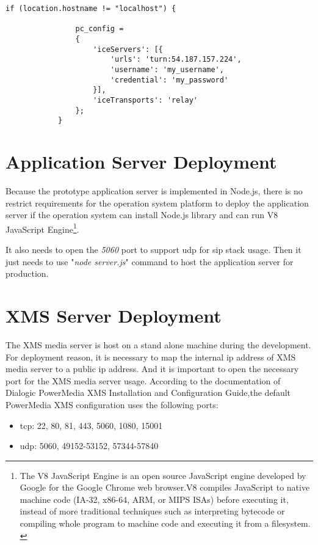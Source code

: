 \begin{lstlisting}[caption={Using TURN Server on WebRTC Client},label={code:client_turn_server}]
if (location.hostname != "localhost") {
  			
				pc_config = 
				{
					'iceServers': [{
						'urls': 'turn:54.187.157.224',
						'username': 'my_username',
						'credential': 'my_password'
					}],
					'iceTransports': 'relay'
				};
			}
\end{lstlisting}


\section{Application Server Deployment}

\par Because the prototype application server is implemented in Node.js, there is no restrict requirements for the operation system platform to deploy the application server if the operation system can install Node.js library and can run V8 JavaScript Engine\footnote{The V8 JavaScript Engine is an open source JavaScript engine developed by Google for the Google Chrome web browser.V8 compiles JavaScript to native machine code (IA-32, x86-64, ARM, or MIPS ISAs) before executing it, instead of more traditional techniques such as interpreting bytecode or compiling whole program to machine code and executing it from a filesystem. \cite{wiki:v8}}.

\par It also needs to open the \textit{5060} port to support \gls{udp} for \gls{sip} stack usage. Then it just needs to use "\textit{node server.js}" command to host the application server for production.

\section{XMS Server Deployment}

\par The XMS media server is host on a stand alone machine during the development. For deployment reason, it is necessary to map the internal \gls{ip} address of XMS media server to a public \gls{ip} address. And it is important to open the necessary port for the XMS media server usage. According to the documentation of Dialogic PowerMedia XMS 
Installation and Configuration Guide\cite{dialogic:xms_install},the default PowerMedia XMS configuration uses the following ports:
\begin{itemize}[topsep=-1em,parsep=0em,itemsep=0em]
 \item \gls{tcp}: 22, 80, 81, 443, 5060, 1080, 15001 
 \item \gls{udp}: 5060, 49152-53152, 57344-57840 
\end{itemize}

